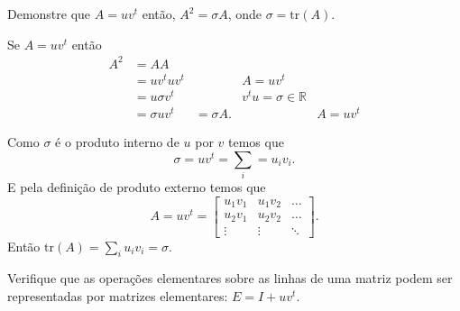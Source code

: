 \documentclass[a4paper,12pt, leqno, answers]{exam}
\begin{document}
\begin{questions}
    \question Demonstre que $A = u v^t$ ent\~{a}o, $A^2 = \sigma A$, onde $\sigma = \mbox{tr}(A)$.
    \begin{solution}
        Se $A = u v^t$ ent\~{a}o
        \begin{align*}
            A^2 &= A A \\
            &= u v^t u v^t && A = u v^t \\
            &= u \sigma v^t && v^t u = \sigma \in \mathbb{R} \\
            &= \sigma u v^t
            &= \sigma A. && A = u v^t
        \end{align*}

        Como $\sigma$ \'{e} o produto interno de $u$ por $v$ temos que
        \[
        \sigma = u v^t = \sum_i = u_i v_i.
        \]
        E pela defini\c{c}\~{a}o de produto externo temos que
        \[
        A = u v^t = \begin{bmatrix}
            u_1 v_1 & u_1 v_2 & \ldots \\
            u_2 v_1 & u_2 v_2 & \ldots \\
            \vdots & \vdots & \ddots
        \end{bmatrix}.
        \]
        Ent\~{a}o $\mbox{tr}(A) = \sum_i u_i v_i = \sigma$.

    \end{solution}

    \question Verifique que as opera\c{c}\~{o}es elementares sobre as linhas de uma matriz podem ser representadas por matrizes elementares: $E = I + u v^t$.
    \begin{parts}

\end{parts}
\end{questions}
\end{document}

